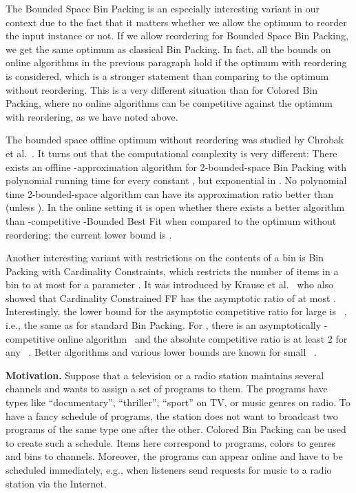 \documentclass[11pt,a4paper]{article}
\begin{document}
The Bounded Space Bin Packing is an especially interesting variant in
our context due to the fact that it matters whether we allow the
optimum to reorder the input instance or not. If we allow reordering
for Bounded Space Bin Packing, we get the same optimum as classical
Bin Packing. In fact, all the bounds on online algorithms in the
previous paragraph hold if the optimum with reordering is considered,
which is a stronger statement than comparing to the optimum without
reordering. This is a very different situation than for Colored Bin
Packing, where no online algorithms can be competitive against the
optimum with reordering, as we have noted above.

The bounded space offline optimum without reordering was studied by
Chro\-bak et al.~\cite{chrobak11}. It turns out that the computational
complexity is very different: There exists an offline
-approximation algorithm for 2-bounded-space Bin
Packing with polynomial running time for every constant
, but exponential in . No polynomial time
2-bounded-space algorithm can have its approximation ratio better than
 (unless ). In the online setting it is open whether there exists a
better algorithm than -competitive -Bounded Best Fit when
compared to the optimum without reordering; the current lower bound is
.

Another interesting variant with restrictions on the contents of a bin
is Bin Packing with Cardinality Constraints, which restricts
the number of items in a bin to at most  for a parameter . It was introduced by Krause et al.~\cite{krause75} who also showed
that Cardinality Constrained FF has the asymptotic ratio of at most
. Interestingly, the lower bound for the asymptotic
competitive ratio for large  is ~\cite{balogh12}, i.e., the
same as for standard Bin Packing. For , there is an
asymptotically -competitive online algorithm~\cite{babel04} and the
absolute competitive ratio is at least 2 for any ~\cite{dosa14bpcc}.  Better algorithms and various lower bounds are
known for small ~\cite{epstein06,babel04}.

\medskip

\textbf{Motivation.}
Suppose that a television or a radio station maintains several
channels and wants to assign a set of programs to them. The programs
have types like ``documentary'', ``thriller'', ``sport'' on TV,
or music genres on radio. To have a fancy schedule
of programs, the station does not want to broadcast two programs of the
same type one after the other. Colored Bin Packing can be used to
create such a schedule. Items here correspond to programs, colors to
genres and bins to channels.  Moreover, the programs can appear online
and have to be scheduled immediately, e.g., when listeners send
requests for music to a radio station via the Internet.
\end{document}
